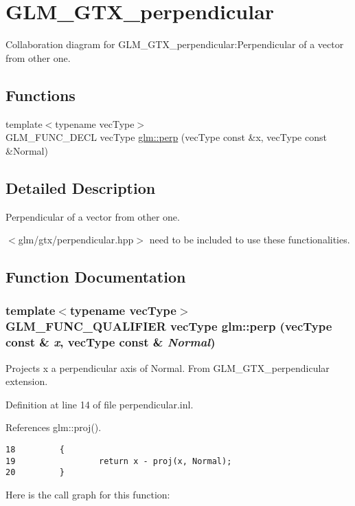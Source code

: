 \hypertarget{group__gtx__perpendicular}{
\section{GLM\_\-GTX\_\-perpendicular}
\label{group__gtx__perpendicular}
}


Collaboration diagram for GLM\_\-GTX\_\-perpendicular:Perpendicular of a vector from other one.  
\subsection*{Functions}
\begin{CompactItemize}
\item 
{\footnotesize template$<$typename vecType$>$ }\\GLM\_\-FUNC\_\-DECL vecType \hyperlink{group__gtx__perpendicular_gcd6201d43400cf027df57552bf92301d}{glm::perp} (vecType const \&x, vecType const \&Normal)
\end{CompactItemize}


\subsection{Detailed Description}
Perpendicular of a vector from other one. 

$<$glm/gtx/perpendicular.hpp$>$ need to be included to use these functionalities. 

\subsection{Function Documentation}
\hypertarget{group__gtx__perpendicular_gcd6201d43400cf027df57552bf92301d}{
\subsubsection[perp]{\setlength{\rightskip}{0pt plus 5cm}template$<$typename vecType$>$ GLM\_\-FUNC\_\-QUALIFIER vecType glm::perp (vecType const \& {\em x}, \/  vecType const \& {\em Normal})}}
\label{group__gtx__perpendicular_gcd6201d43400cf027df57552bf92301d}


Projects x a perpendicular axis of Normal. From GLM\_\-GTX\_\-perpendicular extension. 

Definition at line 14 of file perpendicular.inl.

References glm::proj().

\begin{Code}\begin{verbatim}18         {
19                 return x - proj(x, Normal);
20         }
\end{verbatim}
\end{Code}




Here is the call graph for this function: